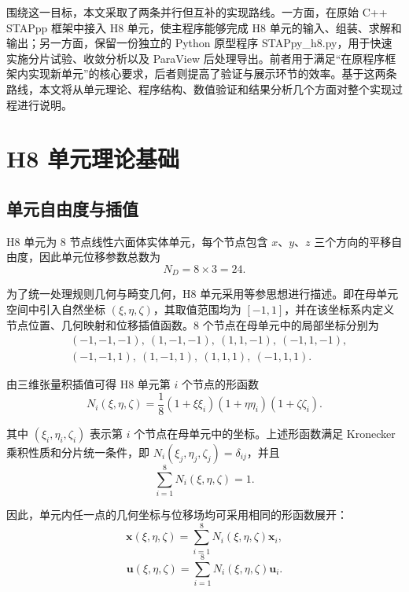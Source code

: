\documentclass[12pt,a4paper]{article}
\begin{document}
围绕这一目标，本文采取了两条并行但互补的实现路线。一方面，在原始 C++ STAPpp 框架中接入 H8 单元，使主程序能够完成 H8 单元的输入、组装、求解和输出；另一方面，保留一份独立的 Python 原型程序 STAPpy\_h8.py，用于快速实施分片试验、收敛分析以及 ParaView 后处理导出。前者用于满足“在原程序框架内实现新单元”的核心要求，后者则提高了验证与展示环节的效率。基于这两条路线，本文将从单元理论、程序结构、数值验证和结果分析几个方面对整个实现过程进行说明。

\section{H8 单元理论基础}

\subsection{单元自由度与插值}

H8 单元为 8 节点线性六面体实体单元，每个节点包含 $x$、$y$、$z$ 三个方向的平移自由度，因此单元位移参数总数为
\begin{equation}
N_D = 8 \times 3 = 24.
\end{equation}

为了统一处理规则几何与畸变几何，H8 单元采用等参思想进行描述。即在母单元空间中引入自然坐标 $(\xi,\eta,\zeta)$，其取值范围均为 $[-1,1]$，并在该坐标系内定义节点位置、几何映射和位移插值函数。8 个节点在母单元中的局部坐标分别为
\begin{equation}
\begin{aligned}
&(-1,-1,-1),\ (1,-1,-1),\ (1,1,-1),\ (-1,1,-1), \\
&(-1,-1,1),\ (1,-1,1),\ (1,1,1),\ (-1,1,1).
\end{aligned}
\end{equation}

由三维张量积插值可得 H8 单元第 $i$ 个节点的形函数
\begin{equation}
N_i(\xi,\eta,\zeta)=\frac{1}{8}(1+\xi\xi_i)(1+\eta\eta_i)(1+\zeta\zeta_i).
\end{equation}

其中 $(\xi_i,\eta_i,\zeta_i)$ 表示第 $i$ 个节点在母单元中的坐标。上述形函数满足 Kronecker 乘积性质和分片统一条件，即 $N_i(\xi_j,\eta_j,\zeta_j)=\delta_{ij}$，并且
\begin{equation}
\sum_{i=1}^{8} N_i(\xi,\eta,\zeta)=1.
\end{equation}

因此，单元内任一点的几何坐标与位移场均可采用相同的形函数展开：
\begin{equation}
\bm{x}(\xi,\eta,\zeta)=\sum_{i=1}^{8} N_i(\xi,\eta,\zeta)\bm{x}_i,
\end{equation}
\begin{equation}
\bm{u}(\xi,\eta,\zeta)=\sum_{i=1}^{8} N_i(\xi,\eta,\zeta)\bm{u}_i.
\end{equation}
\end{document}
